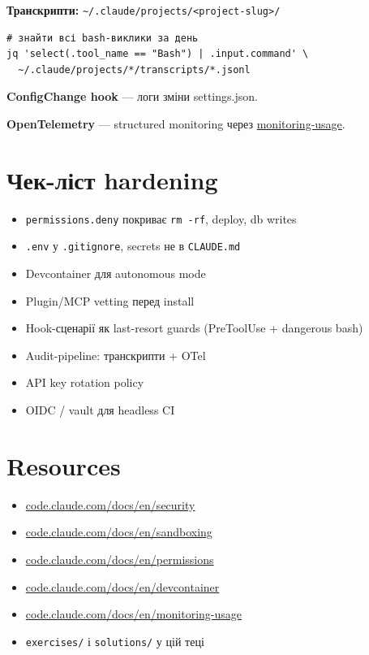 \documentclass[11pt,a4paper]{article}
\begin{document}
\textbf{Транскрипти:} \texttt{\textasciitilde/.claude/projects/<project-slug>/}

\begin{lstlisting}
# знайти всі bash-виклики за день
jq 'select(.tool_name == "Bash") | .input.command' \
  ~/.claude/projects/*/transcripts/*.jsonl
\end{lstlisting}

\textbf{ConfigChange hook} --- логи зміни settings.json.

\textbf{OpenTelemetry} --- structured monitoring через \href{https://code.claude.com/docs/en/monitoring-usage}{monitoring-usage}.

\section{Чек-ліст hardening}

\begin{itemize}[leftmargin=2em]
\item[$\square$] \texttt{permissions.deny} покриває \texttt{rm -rf}, deploy, db writes
\item[$\square$] \texttt{.env} у \texttt{.gitignore}, secrets не в \texttt{CLAUDE.md}
\item[$\square$] Devcontainer для autonomous mode
\item[$\square$] Plugin/MCP vetting перед install
\item[$\square$] Hook-сценарії як last-resort guards (PreToolUse + dangerous bash)
\item[$\square$] Audit-pipeline: транскрипти + OTel
\item[$\square$] API key rotation policy
\item[$\square$] OIDC / vault для headless CI
\end{itemize}

\section{Resources}

\begin{itemize}
\item \href{https://code.claude.com/docs/en/security}{code.claude.com/docs/en/security}
\item \href{https://code.claude.com/docs/en/sandboxing}{code.claude.com/docs/en/sandboxing}
\item \href{https://code.claude.com/docs/en/permissions}{code.claude.com/docs/en/permissions}
\item \href{https://code.claude.com/docs/en/devcontainer}{code.claude.com/docs/en/devcontainer}
\item \href{https://code.claude.com/docs/en/monitoring-usage}{code.claude.com/docs/en/monitoring-usage}
\item \texttt{exercises/} і \texttt{solutions/} у цій теці
\end{itemize}
\end{document}

